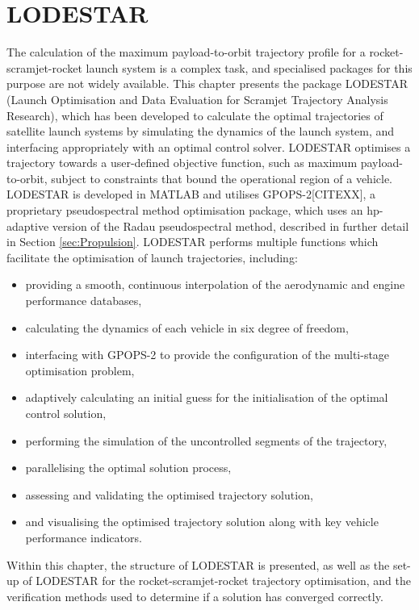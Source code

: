 
\cleardoublepage
\chapter{LODESTAR}\label{chapter:LODESTAR}


The calculation of the maximum payload-to-orbit trajectory profile for a rocket-scramjet-rocket launch system is a complex task, and specialised packages for this purpose are not widely available. 
This chapter presents the package LODESTAR (Launch Optimisation and Data Evaluation for Scramjet Trajectory Analysis Research), which has been developed to calculate the optimal trajectories of satellite launch systems by simulating the dynamics of the launch system, and interfacing appropriately with an optimal control solver. 
LODESTAR optimises a trajectory towards a user-defined objective function, such as maximum payload-to-orbit, subject to constraints that bound the operational region of a vehicle.
LODESTAR is developed in MATLAB and utilises GPOPS-2[CITEXX], a proprietary pseudospectral method optimisation package, which uses an hp-adaptive version of the Radau pseudospectral method, described in further detail in Section \ref{sec:Propulsion}.
LODESTAR performs multiple functions which facilitate the optimisation of launch trajectories, including:
\begin{itemize}
	\item providing a smooth, continuous interpolation of the aerodynamic and engine performance databases, 
	
	\item calculating the dynamics of each vehicle in six degree of freedom,
	
	\item interfacing with GPOPS-2 to provide the configuration of the multi-stage optimisation problem,
	
	\item adaptively calculating an initial guess for the initialisation of the optimal control solution,
	
	\item performing the simulation of the uncontrolled segments of the trajectory, 
	
	\item parallelising the optimal solution process,
	
	\item assessing and validating the optimised trajectory solution, 
	
	\item and visualising the optimised trajectory solution along with key vehicle performance indicators.  
	
	
	
\end{itemize}
 Within this chapter, the structure of LODESTAR is presented, as well as the set-up of LODESTAR for the rocket-scramjet-rocket trajectory optimisation, and the verification methods used to determine if a solution has converged correctly.
 
